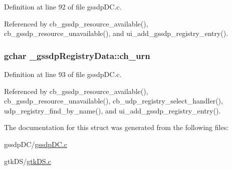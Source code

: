 Definition at line 92 of file gssdp\+D\+C.\+c.



Referenced by cb\+\_\+gssdp\+\_\+resource\+\_\+available(), cb\+\_\+gssdp\+\_\+resource\+\_\+unavailable(), and ui\+\_\+add\+\_\+gssdp\+\_\+registry\+\_\+entry().

\subsubsection[{\texorpdfstring{ch\+\_\+urn}{ch_urn}}]{\setlength{\rightskip}{0pt plus 5cm}gchar \+\_\+gssdp\+Registry\+Data\+::ch\+\_\+urn}\hypertarget{struct__gssdp_registry_data_a57a14b78092cbef8cf6dfa56cffa03db}{}\label{struct__gssdp_registry_data_a57a14b78092cbef8cf6dfa56cffa03db}


Definition at line 93 of file gssdp\+D\+C.\+c.



Referenced by cb\+\_\+gssdp\+\_\+resource\+\_\+available(), cb\+\_\+gssdp\+\_\+resource\+\_\+unavailable(), cb\+\_\+udp\+\_\+registry\+\_\+select\+\_\+handler(), udp\+\_\+registry\+\_\+find\+\_\+by\+\_\+name(), and ui\+\_\+add\+\_\+gssdp\+\_\+registry\+\_\+entry().



The documentation for this struct was generated from the following files\+:\begin{DoxyCompactItemize}
\item 
gssdp\+D\+C/\hyperlink{gssdp_d_c_8c}{gssdp\+D\+C.\+c}\item 
gtk\+D\+S/\hyperlink{gtk_d_s_8c}{gtk\+D\+S.\+c}\end{DoxyCompactItemize}
